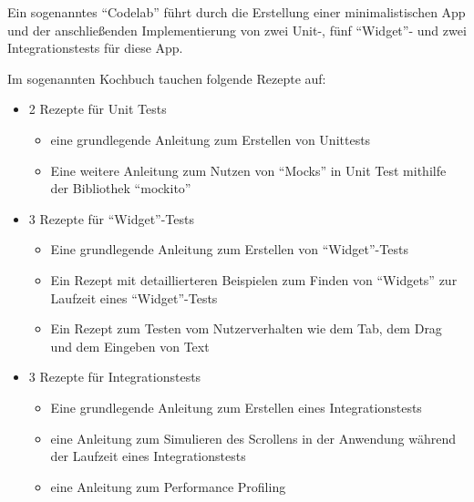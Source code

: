 Ein sogenanntes \enquote{Codelab} führt durch die Erstellung einer minimalistischen App und der anschließenden Implementierung von zwei Unit-, fünf \enquote{Widget}- und zwei Integrationstests für diese App.

Im sogenannten Kochbuch tauchen folgende Rezepte auf:

\begin{itemize}
    \item 2 Rezepte für Unit Tests
    \begin{itemize} 
       \item eine grundlegende Anleitung zum Erstellen von Unittests 
       \item Eine weitere Anleitung zum Nutzen von \enquote{Mocks} in Unit Test mithilfe der Bibliothek \enquote{mockito} 
    \end{itemize}
    \item 3 Rezepte für \enquote{Widget}-Tests
    \begin{itemize} 
        \item Eine grundlegende Anleitung zum Erstellen von \enquote{Widget}-Tests 
        \item Ein Rezept mit detaillierteren Beispielen zum Finden von \enquote{Widgets}  zur Laufzeit eines \enquote{Widget}-Tests 
        \item Ein Rezept zum Testen vom Nutzerverhalten wie dem Tab, dem Drag und dem Eingeben von Text 
     \end{itemize}
    \item 3 Rezepte für Integrationstests
    \begin{itemize} 
        \item Eine grundlegende Anleitung zum Erstellen eines Integrationstests 
        \item eine Anleitung zum Simulieren des Scrollens in der Anwendung während der Laufzeit eines Integrationstests 
        \item eine Anleitung zum Performance Profiling 
     \end{itemize}
\end{itemize}


